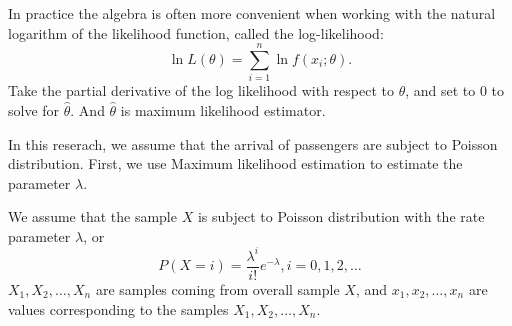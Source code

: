 \documentclass{mcmthesis}
\begin{document}
		In practice the algebra is often more convenient when working with the natural logarithm of the likelihood function, called the log-likelihood:
			\begin{equation}
				\ln L(\theta) = \sum_{i=1}^{n}\ln f(x_i;\theta). 
			\end{equation}
		Take the partial derivative of the log likelihood with respect to ${\theta}$, and set to 0 to solve for ${\hat \theta}$. And ${\hat \theta}$ is maximum likelihood estimator.

		In this reserach, we assume that the arrival of passengers are subject to Poisson distribution. First, we use Maximum likelihood estimation to estimate the parameter ${\lambda}$.

		We assume that the sample ${X}$ is subject to Poisson distribution with the rate parameter ${\lambda}$, or
			\begin{equation}
				P(X = i) = \frac {\lambda ^ i}{i!}e^{-\lambda},i=0,1,2,\dots
			\end{equation}
		${X_1, X_2, \dots , X_n}$ are samples coming from overall sample ${X}$, and ${x_1, x_2, \dots , x_n}$ are values corresponding to the samples  ${X_1, X_2, \dots , X_n}$. 
		
\end{document}
